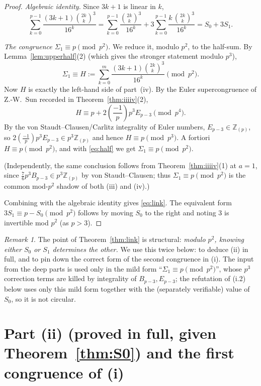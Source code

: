 \documentclass[12pt]{article}
\theoremstyle{remark}
\newtheorem{remark}{Remark}
\newcommand{\leg}[2]{\left(\frac{#1}{#2}\right)}
\newcommand{\bin}[2]{\binom{#1}{#2}}
\begin{document}
\begin{proof}
\emph{Algebraic identity.}  Since $3k+1$ is linear in $k$,
\[
\sum_{k=0}^{p-1}\frac{(3k+1)\bin{2k}{k}^3}{16^k}
=\sum_{k=0}^{p-1}\frac{\bin{2k}{k}^3}{16^k}
+3\sum_{k=0}^{p-1}\frac{k\,\bin{2k}{k}^3}{16^k}
=S_0+3S_1 .
\]

\emph{The congruence $\Sigma_1\equiv p\pmod{p^2}$.}  We reduce it, modulo
$p^2$, to the half-sum.  By Lemma~\ref{lem:upperhalf}(2) (which gives the
stronger statement modulo $p^3$),
\begin{equation}\label{eq:half}
\Sigma_1\equiv H:=\sum_{k=0}^{m}\frac{(3k+1)\bin{2k}{k}^3}{16^k}\pmod{p^2}.
\end{equation}
Now $H$ is exactly the left-hand side of part~(iv).  By the Euler
supercongruence of Z.-W.\ Sun recorded in Theorem~\ref{thm:iiiiv}(2),
\[
H\equiv p+2\leg{-1}{p}p^3E_{p-3}\pmod{p^4}.
\]
By the von Staudt--Clausen/Carlitz integrality of Euler numbers,
$E_{p-3}\in\mathbb Z_{(p)}$, so $2\leg{-1}{p}p^3E_{p-3}\in p^3\mathbb Z_{(p)}$
and hence $H\equiv p\pmod{p^3}$.  A fortiori $H\equiv p\pmod{p^2}$, and with
\eqref{eq:half} we get $\Sigma_1\equiv p\pmod{p^2}$.

(Independently, the same conclusion follows from
Theorem~\ref{thm:iiiiv}(1) at $a=1$, since $\tfrac76p^3B_{p-3}\in p^3\mathbb
Z_{(p)}$ by von Staudt--Clausen; thus $\Sigma_1\equiv p\pmod{p^2}$ is the
common mod-$p^2$ shadow of both (iii) and (iv).)

Combining with the algebraic identity gives \eqref{eq:link}.  The equivalent
form $3S_1\equiv p-S_0\pmod{p^2}$ follows by moving $S_0$ to the right and
noting $3$ is invertible mod $p^2$ (as $p>3$).
\end{proof}

\begin{remark}
The point of Theorem~\ref{thm:link} is structural: \emph{modulo $p^2$, knowing
either $S_0$ or $S_1$ determines the other.}  We use this twice below: to
deduce (ii) in full, and to pin down the correct form of the second congruence
in (i).  The input from the deep parts is used only in the mild form
``$\Sigma_1\equiv p\pmod{p^2}$'', whose $p^3$ correction terms are killed by
integrality of $B_{p-3},E_{p-3}$; the refutation of (i.2) below uses only this
mild form together with the (separately verifiable) value of $S_0$, so it is
not circular.
\end{remark}

\section{Part (ii) (proved in full, given Theorem~\ref{thm:S0}) and the first
congruence of (i)}
\end{document}
